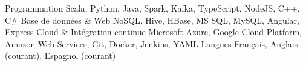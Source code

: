 \begin{cvskills}
	\cvskill
	{Programmation}
	{Scala, Python, Java, Spark, Kafka, TypeScript, NodeJS, C++, C\#}
	\cvskill
	{Base de données \& Web}
	{NoSQL, Hive, HBase, MS SQL, MySQL, Angular, Express}
	\cvskill
	{Cloud \& Intégration continue}
	{Microsoft Azure, Google Cloud Platform, Amazon Web Services, Git, Docker, Jenkins, YAML}
	\cvskill
	{Langues}
	{Français, Anglais (courant), Espagnol (courant)}
\end{cvskills}